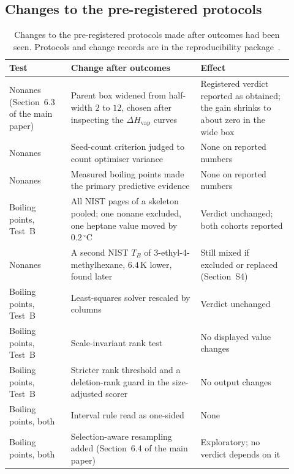 \documentclass[a5paper, 10pt]{article}
\theoremstyle{plain}
\theoremstyle{remark}
\theoremstyle{definition}
\begin{document}
\subsection{Changes to the pre-registered protocols}

\begin{table}[htbp]
\centering
\caption{Changes to the pre-registered protocols made after outcomes
had been seen. Protocols and change records are in the
reproducibility package~\cite{LoyolaRepo}.}
\label{tab:deviations}
\scriptsize
\setlength{\tabcolsep}{3pt}
\begin{tabular}{>{\raggedright\arraybackslash}p{0.2\linewidth}>{\raggedright\arraybackslash}p{0.42\linewidth}>{\raggedright\arraybackslash}p{0.3\linewidth}}
\toprule
Test & Change after outcomes & Effect\\
\midrule
Nonanes (Section~6.3 of the main paper) & Parent box widened from half-width
$2$ to $12$, chosen after inspecting the $\Delta H_{\mathrm{vap}}$ curves &
Registered verdict reported as obtained; the gain shrinks to about
zero in the wide box\\
Nonanes & Seed-count criterion judged to count optimiser variance &
None on reported numbers\\
Nonanes & Measured boiling points made the primary predictive evidence &
None on reported numbers\\
Boiling points, Test~B & All NIST pages of a skeleton pooled; one
nonane excluded, one heptane value moved by $0.2\,^{\circ}$C &
Verdict unchanged; both cohorts reported\\
Nonanes & A second NIST $T_B$ of 3-ethyl-4-methylhexane, $6.4$\,K
lower, found later & Still mixed if excluded or replaced (Section~S4)\\
Boiling points, Test~B & Least-squares solver rescaled by columns &
Verdict unchanged\\
Boiling points, Test~B & Scale-invariant rank test & No displayed value changes\\
Boiling points, Test~B & Stricter rank threshold and a deletion-rank guard in the size-adjusted scorer & No output changes\\
Boiling points, both & Interval rule read as one-sided & None\\
Boiling points, both & Selection-aware resampling added
(Section~6.4 of the main paper) & Exploratory; no verdict depends on it\\
\bottomrule
\end{tabular}
\end{table}
\end{document}
